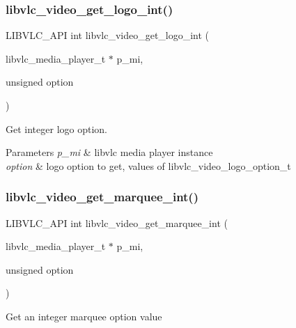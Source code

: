 \subsubsection{\texorpdfstring{libvlc\+\_\+video\+\_\+get\+\_\+logo\+\_\+int()}{libvlc\_video\_get\_logo\_int()}}
{\footnotesize\ttfamily L\+I\+B\+V\+L\+C\+\_\+\+A\+PI int libvlc\+\_\+video\+\_\+get\+\_\+logo\+\_\+int (\begin{DoxyParamCaption}\item[{libvlc\+\_\+media\+\_\+player\+\_\+t $\ast$}]{p\+\_\+mi,  }\item[{unsigned}]{option }\end{DoxyParamCaption})}

Get integer logo option.


\begin{DoxyParams}{Parameters}
{\em p\+\_\+mi} & libvlc media player instance \\
\hline
{\em option} & logo option to get, values of libvlc\+\_\+video\+\_\+logo\+\_\+option\+\_\+t \\
\hline
\end{DoxyParams}
\mbox{\label{group__libvlc__video_gad4b75c4cdc2de2d7316201d6c4f4a1c5}} 
\subsubsection{\texorpdfstring{libvlc\+\_\+video\+\_\+get\+\_\+marquee\+\_\+int()}{libvlc\_video\_get\_marquee\_int()}}
{\footnotesize\ttfamily L\+I\+B\+V\+L\+C\+\_\+\+A\+PI int libvlc\+\_\+video\+\_\+get\+\_\+marquee\+\_\+int (\begin{DoxyParamCaption}\item[{libvlc\+\_\+media\+\_\+player\+\_\+t $\ast$}]{p\+\_\+mi,  }\item[{unsigned}]{option }\end{DoxyParamCaption})}

Get an integer marquee option value


